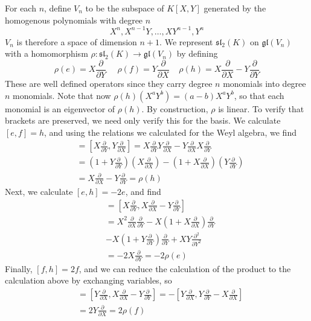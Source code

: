 For each $n$, define $V_n$ to be the subspace of $K[X,Y]$ generated by the homogenous polynomials with degree $n$
%
\[ X^n, X^{n-1}Y, \dots, XY^{n-1}, Y^n \]
%
$V_n$ is therefore a space of dimension $n+1$. We represent $\mathfrak{sl}_2(K)$ on $\mathfrak{gl}(V_n)$ with a homomorphism $\rho: \mathfrak{sl}_2(K) \to \mathfrak{gl}(V_n)$ by defining
%
\[ \rho(e) = X \frac{\partial}{\partial Y} \ \ \ \ \ \ \rho(f) = Y \frac{\partial}{\partial X}\ \ \ \ \ \rho(h) = X \frac{\partial}{\partial X} - Y \frac{\partial}{\partial Y} \]
%
These are well defined operators since they carry degree $n$ monomials into degree $n$ monomials. Note that now $\rho(h)(X^aY^b) = (a - b) X^aY^b$, so that each monomial is an eigenvector of $\rho(h)$. By construction, $\rho$ is linear. To verify that brackets are preserved, we need only verify this for the basis. We calculate $[e, f] = h$, and using the relations we calculated for the Weyl algebra, we find
%
\begin{align*}
    [\rho(e),\rho(f)] &= \left[ X \frac{\partial}{\partial Y}, Y \frac{\partial}{\partial X} \right] = X \frac{\partial}{\partial Y} Y \frac{\partial}{\partial X} - Y \frac{\partial}{\partial X} X \frac{\partial}{\partial Y}\\
    &= \left(1 + Y \frac{\partial}{\partial Y} \right) \left( X \frac{\partial}{\partial X} \right) - \left( 1 + X \frac{\partial}{\partial X} \right) \left( Y \frac{\partial}{\partial Y} \right)\\
    &= X \frac{\partial}{\partial X} - Y \frac{\partial}{\partial Y} = \rho(h)
\end{align*}
%
Next, we calculate $[e, h] = -2 e$, and find
%
\begin{align*}
    [\rho(e), \rho(h)] &= \left[ X \frac{\partial}{\partial Y}, X \frac{\partial}{\partial X} - Y \frac{\partial}{\partial Y} \right]\\
    &= X^2 \frac{\partial}{\partial X} \frac{\partial}{\partial Y} - X \left(1 + X \frac{\partial}{\partial X} \right) \frac{\partial}{\partial Y}\\
    &- X \left( 1 + Y \frac{\partial}{\partial Y} \right) \frac{\partial}{\partial Y} + X Y \frac{\partial^2}{\partial Y^2}\\
    &= -2 X \frac{\partial}{\partial Y} = -2 \rho(e)
\end{align*}
%
Finally, $[f, h] = 2f$, and we can reduce the calculation of the product to the calculation above by exchanging variables, so
%
\begin{align*}
    [\rho(f), \rho(h)] &= \left[ Y \frac{\partial}{\partial X}, X \frac{\partial}{\partial X} - Y \frac{\partial}{\partial Y} \right] = - \left[ Y \frac{\partial}{\partial X}, Y \frac{\partial}{\partial Y} - X \frac{\partial}{\partial X} \right]\\
    &= 2 Y \frac{\partial}{\partial X} = 2 \rho(f)
\end{align*}
